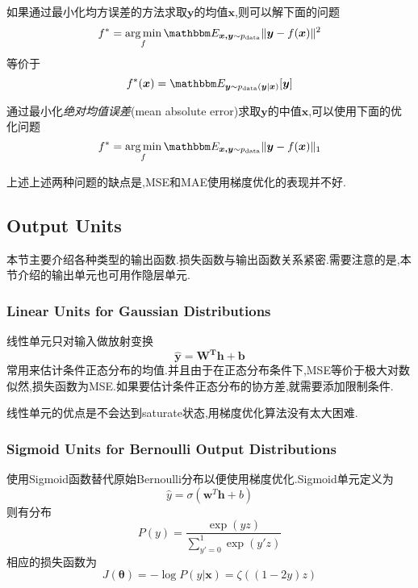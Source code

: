如果通过最小化均方误差的方法求取$\bm y$的均值$\bm x$,则可以解下面的问题
\begin{equation}
f^\ast=\mathop{\arg\min}_{f}\mathbbm E_{\bm{x,y}\sim p_{\text{data}}}\|\bm y-f(\bm x)\|^2
\end{equation}
等价于
\begin{equation}
f^\ast(\bm x)=\mathbbm E_{\bm y\sim p_{\text{data}}(\bm y|\bm x)}[\bm y]
\end{equation}

通过最小化\textit{绝对均值误差}(mean absolute error)求取$\bm y$的中值$\bm x$,可以使用下面的优化问题
\begin{equation}
f^\ast=\mathop{\arg\min}_{f}\mathbbm E_{\bm{x,y}\sim p_{\text{data}}}\|\bm y-f(\bm x)\|_1
\end{equation}

上述上述两种问题的缺点是,MSE和MAE使用梯度优化的表现并不好.

\subsection{Output Units}

本节主要介绍各种类型的输出函数.损失函数与输出函数关系紧密.需要注意的是,本节介绍的输出单元也可用作隐层单元.

\subsubsection{Linear Units for Gaussian Distributions}

线性单元只对输入做放射变换
\begin{equation}
\bm{\hat y=W^Th+b}
\end{equation}
常用来估计条件正态分布的均值.并且由于在正态分布条件下,MSE等价于极大对数似然,损失函数为MSE.如果要估计条件正态分布的协方差,就需要添加限制条件.

线性单元的优点是不会达到saturate状态,用梯度优化算法没有太大困难.

\subsubsection{Sigmoid Units for Bernoulli Output Distributions}

使用Sigmoid函数替代原始Bernoulli分布以便使用梯度优化.Sigmoid单元定义为
\begin{equation}
\hat y=\sigma(\bm w^T\bm h+b)
\end{equation}
则有分布
\begin{equation}
P(y)=\frac{\exp{(yz)}}{\sum_{y'=0}^1\exp(y'z)}
\end{equation}
相应的损失函数为
\begin{equation}
J({\bm\theta})=-\log P(y|\bm x)=\zeta((1-2y)z)
\end{equation}


